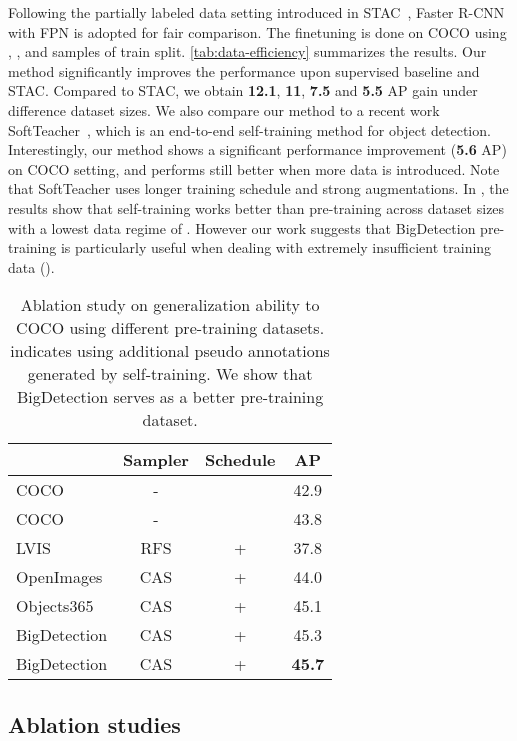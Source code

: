 \documentclass[10pt,twocolumn,letterpaper]{article}
\begin{document}
Following the partially labeled data setting introduced in STAC~\cite{sohn2020simple}, Faster R-CNN~\cite{ren2015faster} with FPN is adopted for fair comparison. The finetuning is done on COCO using , ,  and  samples of train split. 
\cref{tab:data-efficiency} summarizes the results.
Our method significantly improves the performance upon supervised baseline and STAC. 
Compared to STAC, we obtain \textbf{12.1}, \textbf{11}, \textbf{7.5} and \textbf{5.5} AP gain under difference dataset sizes. 
We also compare our method to a recent work SoftTeacher~\cite{xu2021end}, which is an end-to-end self-training method for object detection.
Interestingly, our method shows a significant performance improvement (\textbf{5.6} AP) on  COCO setting, and performs still better when more data is introduced. 
Note that SoftTeacher uses longer training schedule and strong augmentations.
In \cite{zoph2020rethinking}, the results show that self-training works better than pre-training across dataset sizes with a lowest data regime of .
However our work suggests that BigDetection pre-training is particularly useful when dealing with extremely insufficient training data (). 

\begin{table}[t]
\begin{center}
        \begin{tabular}{lccc}
            \toprule
             & Sampler & Schedule & AP \\
            \hline
            COCO & - &  & 42.9 \\
            COCO & - &  & 43.8 \\
            LVIS & RFS & + & 37.8 \\
            OpenImages & CAS & + & 44.0 \\
            Objects365 & CAS & + & 45.1 \\
            \hline
            BigDetection & CAS & + & 45.3 \\
            BigDetection & CAS & + & \textbf{45.7} \\
            \bottomrule
        \end{tabular}
    \end{center}
    \vspace{-2ex}
    \caption{Ablation study on generalization ability to COCO using different pre-training datasets.  indicates using additional pseudo annotations generated by self-training. We show that BigDetection serves as a better pre-training dataset. }
    \label{tab:data_ablation}
    \vspace{-2ex}
\end{table} \subsection{Ablation studies}
\label{subsec:ablation}
\end{document}
